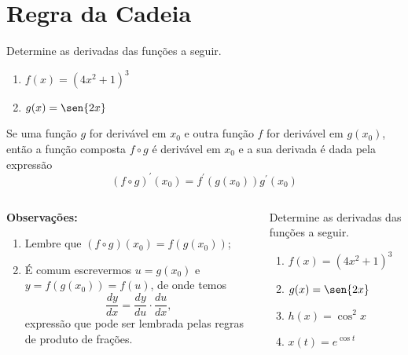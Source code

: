 \section{Regra da Cadeia}
\begin{frame}
  \begin{example}
    Determine as derivadas das funções a seguir.
    \begin{enumerate}
      \item $f(x) = (4x^{2} + 1)^{3}$
      \item $g(x) = \sen{2x}$
    \end{enumerate}
  \end{example}
\end{frame}

\begin{frame}
  \begin{theorem}
    Se uma função $g$ for derivável em $x_{0}$ e outra função $f$ for derivável em $g(x_{0})$, então a função composta $f\circ g$ é derivável em $x_{0}$ e a sua derivada é dada pela expressão
    \begin{equation*}
      \left(f\circ g\right)^{\prime}(x_{0}) = f^{\prime}(g(x_{0}))g^{\prime}(x_{0})
    \end{equation*}
  \end{theorem}
  \begin{columns}[onlytextwidth]
    \begin{column}{0.49\textwidth}
      \begin{highlight}
        \textbf{Observações:}
        \begin{enumerate}
          \item Lembre que $(f\circ g)(x_{0}) = f(g(x_{0}))$;
          \item É comum escrevermos $u=g(x_{0})$ e $y = f(g(x_{0})) = f(u)$, de onde temos
          \begin{equation*}
            \frac{dy}{dx} = \frac{dy}{du}\cdot\frac{du}{dx},
          \end{equation*}
          expressão que pode ser lembrada pelas regras de produto de frações.
        \end{enumerate}
      \end{highlight}
    \end{column}
    \begin{column}{0.49\textwidth}
      \begin{example-highlight}
        Determine as derivadas das funções a seguir.
        \begin{enumerate}
          \item $f(x) = (4x^{2} + 1)^{3}$
          \item $g(x) = \sen{2x}$
          \item $h(x) = \cos^{2}{x}$
          \item $x(t) = e^{\cos{t}}$
        \end{enumerate}
      \end{example-highlight}
    \end{column}
  \end{columns}
\end{frame}


